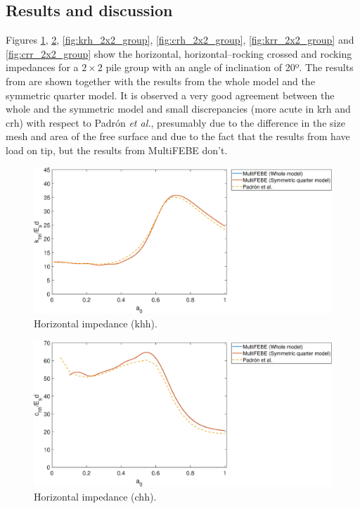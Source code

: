 \documentclass[a4]{article}
\begin{document}
\subsection{Results and discussion}

Figures \ref{fig:khh_2x2_group}, \ref{fig:chh_2x2_group}, \ref{fig:krh_2x2_group}, \ref{fig:crh_2x2_group}, \ref{fig:krr_2x2_group} and \ref{fig:crr_2x2_group} show the horizontal, horizontal–rocking crossed and rocking impedances for a $2 \times 2 $ pile group with an angle of inclination of 20º. The results from \cite{padron} are shown together with the results from the whole model and the symmetric quarter model. It is observed a very good agreement between the whole and the symmetric model and small discrepancies (more acute in krh and crh)  with respect to Padrón \textit{et al.}, presumably due to the difference in the size mesh and area of the free surface and due to the fact that the results from \cite{padron} have load on tip, but the results from MultiFEBE don't. 

\begin{figure}[h!]
	\centering
	\includegraphics[scale=0.5]{khh_2x2_group.eps}
	\caption{Horizontal impedance (khh).}
	\label{fig:khh_2x2_group}
\end{figure}

\begin{figure}[h!]
	\centering
	\includegraphics[scale=0.5]{chh_2x2_group.eps}
	\caption{Horizontal impedance (chh).}
	\label{fig:chh_2x2_group}
\end{figure}
\end{document}
